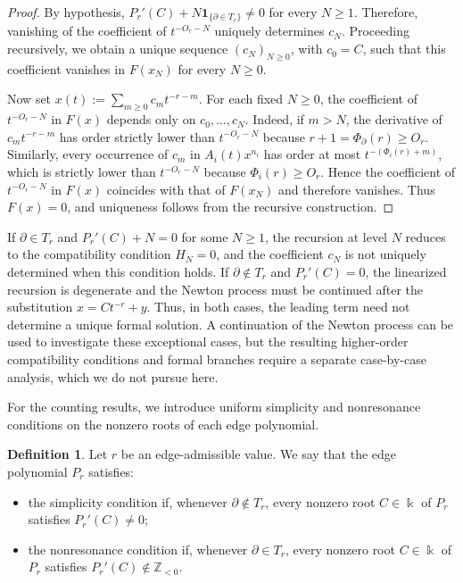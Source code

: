 \documentclass[12pt,a4paper]{amsart}
\numberwithin{theorem}{section}
\theoremstyle{definition}
\newtheorem{definition}[theorem]{Definition}
\begin{document}
\begin{proof}
		By hypothesis, $P_r'(C)+N\mathbf{1}_{\{\partial\in T_r\}}\neq0$ for every $N\geq1$. Therefore, vanishing of the coefficient of $t^{-O_r-N}$ uniquely determines $c_N$. Proceeding recursively, we obtain a unique sequence $(c_N)_{N\geq0}$, with $c_0=C$, such that this coefficient vanishes in $F(x_N)$ for every $N\geq0$.
		
		Now set $x(t):=\sum_{m\geq0}c_mt^{-r-m}$. For each fixed $N\geq0$, the coefficient of $t^{-O_r-N}$ in $F(x)$ depends only on $c_0,\ldots,c_N$. Indeed, if $m>N$, the derivative of $c_mt^{-r-m}$ has order strictly lower than $t^{-O_r-N}$ because $r+1=\Phi_\partial(r)\geq O_r$. Similarly, every occurrence of $c_m$ in $A_i(t)x^{n_i}$ has order at most $t^{-(\Phi_i(r)+m)}$, which is strictly lower than $t^{-O_r-N}$ because $\Phi_i(r)\geq O_r$. Hence the coefficient of $t^{-O_r-N}$ in $F(x)$ coincides with that of $F(x_N)$ and therefore vanishes. Thus $F(x)=0$, and uniqueness follows from the recursive construction.
	\end{proof}
	
	If $\partial\in T_r$ and $P_r'(C)+N=0$ for some $N\geq1$, the recursion at level $N$ reduces to the compatibility condition $H_N=0$, and the coefficient $c_N$ is not uniquely determined when this condition holds. If $\partial\notin T_r$ and $P_r'(C)=0$, the linearized recursion is degenerate and the Newton process must be continued after the substitution $x=Ct^{-r}+y$. Thus, in both cases, the leading term need not determine a unique formal solution. A continuation of the Newton process can be used to investigate these exceptional cases, but the resulting higher-order compatibility conditions and formal branches require a separate case-by-case analysis, which we do not pursue here.
	
	For the counting results, we introduce uniform simplicity and nonresonance conditions on the nonzero roots of each edge polynomial.
	
	\begin{definition}\label{def:SN}
		Let $r$ be an edge-admissible value. We say that the edge polynomial $P_r$ satisfies:
		\begin{itemize}
			\item[\textup{(S)}] the simplicity condition if, whenever $\partial\notin T_r$, every nonzero root $C\in\Bbbk$ of $P_r$ satisfies $P_r'(C)\neq0$;
			\item[\textup{(NR)}] the nonresonance condition if, whenever $\partial\in T_r$, every nonzero root $C\in\Bbbk$ of $P_r$ satisfies $P_r'(C)\notin\mathbb{Z}_{<0}$.
		\end{itemize}
	\end{definition}
	
\end{document}
